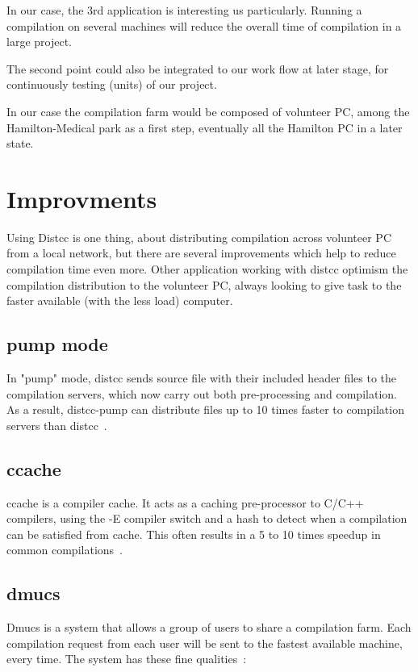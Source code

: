 \documentclass{article}
\begin{document}
In our case, the 3rd application is interesting us particularly. Running a
compilation on several machines will reduce the overall time of compilation in
a large project.

The second point could also be integrated to our work flow at later stage, for
continuously testing (units) of our project.

In our case the compilation farm would be composed of volunteer PC, among the
Hamilton-Medical park as a first step, eventually all the Hamilton PC in a later
state.

\section{Improvments}
Using Distcc is one thing, about distributing compilation across volunteer PC
from a local network, but there are several improvements which help to reduce
compilation time even more. Other application working with distcc optimism the
compilation distribution to the volunteer PC, always looking to give task to the
faster available (with the less load) computer.

\subsection{pump mode}
In "pump" mode, distcc sends source file with their included header files to
the compilation servers, which now carry out both pre-processing and
compilation. As a result, distcc-pump can distribute files up to 10 times
faster to compilation servers than distcc~\cite{distcc-gg}.

\subsection{ccache}
ccache is a compiler cache. It acts as a caching pre-processor to C/C++
compilers, using the -E compiler switch and a hash to detect when a compilation
can be satisfied from cache. This often results in a 5 to 10 times speedup in
common compilations~\cite{ccache}.

\subsection{dmucs}
Dmucs is a system that allows a group of users to share a compilation farm. 
Each compilation request from each user will be sent to the fastest available
machine, every time.  The system has these fine qualities~\cite{dmucs}:  
\end{document}
